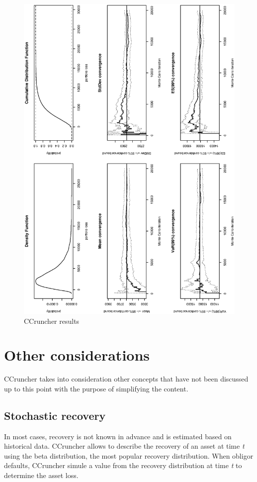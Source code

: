 \documentclass[a4paper,12pt,final]{article}
\begin{document}
\begin{figure}[p]
\begin{center}
\includegraphics[width=12cm,angle=0]{./images/report.eps}
\caption{CCruncher results}
\label{report}
\end{center}
\end{figure}


\clearpage
\section{Other considerations}
CCruncher takes into consideration other concepts that have not been discussed 
up to this point with the purpose of simplifying the content.

\subsection{Stochastic recovery}
In most cases, recovery is not known in advance and is estimated based on historical data. 
CCruncher allows to describe the recovery of an asset at time \emph{t} using the beta 
distribution, the most popular recovery distribution. When obligor defaults, 
CCruncher simule a value from the recovery distribution at time \emph{t} 
to determine the asset loss.
\end{document}
